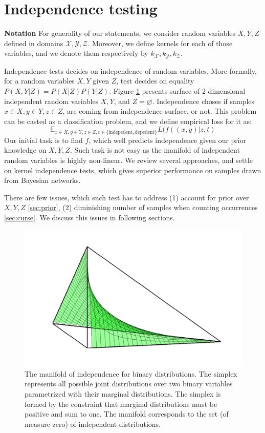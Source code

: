 \documentclass{article} %
\begin{document}
\section{Independence testing} 
{\bf Notation} 
For generality of our statements, we consider random variables $X, Y, Z$ defined in domains $\mathcal{X}, \mathcal{Y}, \mathcal{Z}$. Moreover,
we define kernels for each of those variables, and we denote them respectively by $k_{\mathcal{X}}, k_{\mathcal{Y}}, k_{\mathcal{Z}}$.


Independence tests decides on independence of random variables. More formally,
for a random variables $X, Y$ given $Z$, test decides on equality $P(X, Y| Z) = P(X | Z) P(Y | Z)$. 
Figure \ref{fig:ind} presents surface of $2$ dimensional independent 
random variables $X, Y$, and $Z = \varnothing$. Independence choses if samples $x \in X, y \in Y, z \in Z$, 
are coming from independence surface, or not. 
This problem can be casted as a classification problem, and we define
empirical loss for it as:
\begin{equation}
  \mathbb{E}_{x \in X, y \in Y, z \in Z, t \in \{\text{indepedent}, \text{depedent}\}} L(f((x, y)|z, t)
\end{equation}
Our initial task is to find $f$, which well predicts independence given our prior
knowledge on $X, Y, Z$. Such task is not easy as the manifold of independent
random variables is highly non-linear. We review several approaches, and 
settle on kernel independence tests, which gives superior performance on
samples drawn from Bayesian networks.


There are few issues, which such test has to address 
(1) account for prior over $X, Y, Z$ \ref{sec:prior}, (2) diminishing number of samples when
counting occurrences \ref{sec:curse}. We discuss this issues
in following sections. 


\begin{figure}[h]
\centering
\includegraphics[width=0.35\linewidth]{img/independence_surface-eps-converted-to-crop.pdf}
\caption{The manifold of independence for binary distributions. The simplex represents all possible joint distributions over two binary variables parametrized with their marginal distributions. The simplex is formed by the constraint that marginal distributions must be positive and sum to one.  The manifold corresponds to the set (of measure zero) of independent distributions.}
\label{fig:ind}
\end{figure}
\end{document}

